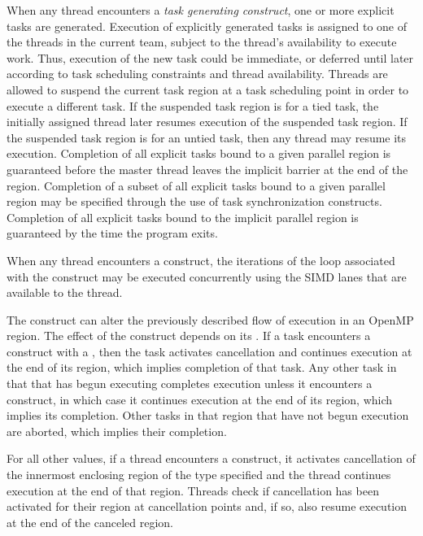 When any thread encounters a \emph{task generating construct}, one or more explicit tasks are generated.
Execution of explicitly generated tasks is assigned to one of the threads in the current 
team, subject to the thread's availability to execute work. Thus, execution of the new 
task could be immediate, or deferred until later according to task scheduling constraints 
and thread availability. Threads are allowed to suspend the current task region at a task 
scheduling point in order to execute a different task. If the suspended task region is for
a tied task, the initially assigned thread later resumes execution of the suspended task
region. If the suspended task region is for an untied task, then any thread may resume its
execution. Completion of all explicit tasks bound to a given parallel region is guaranteed
before the master thread leaves the implicit barrier at the end of the region. Completion
of a subset of all explicit tasks bound to a given parallel region may be specified through
the use of task synchronization constructs. Completion of all explicit tasks bound to the
implicit parallel region is guaranteed by the time the program exits.

When any thread encounters a  construct, the iterations of the loop associated with
the construct may be executed concurrently using the SIMD lanes that are available to
the thread.

The  construct can alter the previously described flow of execution in an
OpenMP region. The effect of the  construct depends on its 
. If a task encounters a  
construct with a  
, then the task activates cancellation 
and continues execution at the end of its
 region, which implies completion of that task. 
Any other task in that 
that has begun executing completes execution unless it encounters a 
 construct, in which case it continues execution at the end of its  region,
which implies its completion. Other tasks in that  region that have not
begun execution are aborted, which implies their completion.

For all other  values, if a 
thread encounters a  construct, it
activates cancellation of the innermost enclosing region of the type specified and the 
thread continues execution at the end of that region. Threads check if cancellation has 
been activated for their region at cancellation points and, if so, also resume execution at 
the end of the canceled region.

